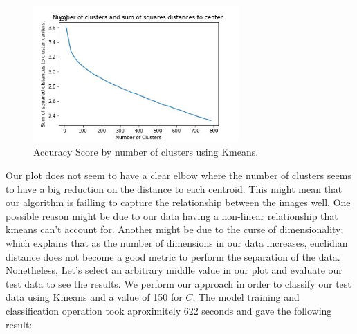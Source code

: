 \documentclass[11pt]{article}
\begin{document}
\begin{singlespace}
\begin{figure}[h]
    \centering
    \includegraphics[width=0.7\textwidth]{plots/den-est-valid2.jpg}
    \caption{Accuracy Score by number of clusters using Kmeans.}
\end{figure}

Our plot does not seem to have a clear elbow where the number of clusters seems to have a big reduction on the distance to each centroid. This might mean that our algorithm is failling to capture the relationship between the images well. One possible reason might be due to our data having a non-linear relationship that kmeans can't account for. Another might be due to the curse of dimensionality; which explains that as the number of dimensions in our data increases, euclidian distance does not become a good metric to perform the separation of the data. Nonetheless, Let's select an arbitrary middle value in our plot and evaluate our test data to see the results. We perform our approach in order to classify our test data using Kmeans and a value of 150 for $C$. The model training and classification operation took aproximitely 622 seconds and gave the following result:\\

\begin{figure}[h]
    \centering
    

\end{figure}
\end{singlespace}
\end{document}
